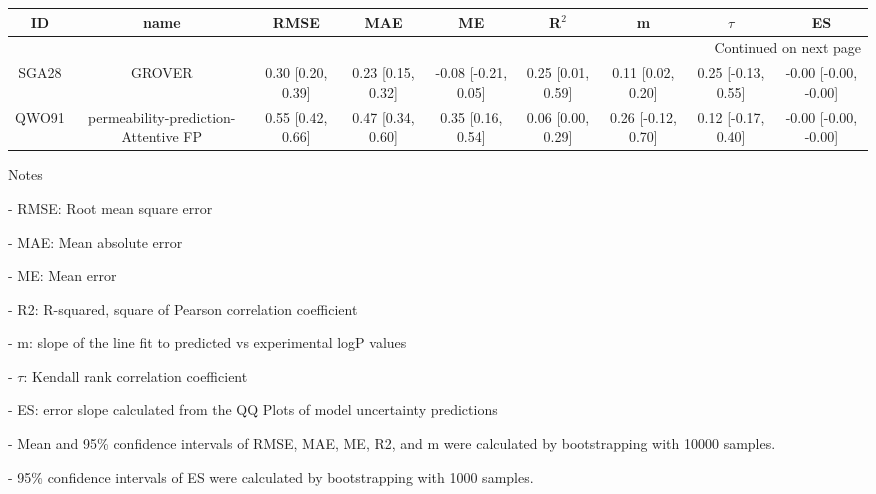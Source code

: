 \documentclass{article}
\begin{document}
\begin{center}
\scriptsize
\begin{longtable}{|ccccccccc|}
\toprule
    ID &                                  name &               RMSE &                MAE &                   ME &              R$^2$ &                   m &              $\tau$ &                    ES \\
\midrule
\endhead
\midrule
\multicolumn{9}{r}{{Continued on next page}} \\
\midrule
\endfoot

\bottomrule
\endlastfoot
 SGA28 &                                GROVER &  0.30 [0.20, 0.39] &  0.23 [0.15, 0.32] &  -0.08 [-0.21, 0.05] &  0.25 [0.01, 0.59] &   0.11 [0.02, 0.20] &  0.25 [-0.13, 0.55] &  -0.00 [-0.00, -0.00] \\
 QWO91 &  permeability-prediction-Attentive FP &  0.55 [0.42, 0.66] &  0.47 [0.34, 0.60] &    0.35 [0.16, 0.54] &  0.06 [0.00, 0.29] &  0.26 [-0.12, 0.70] &  0.12 [-0.17, 0.40] &  -0.00 [-0.00, -0.00] \\
\end{longtable}
\end{center}

Notes

- RMSE: Root mean square error

- MAE: Mean absolute error

- ME: Mean error

- R2: R-squared, square of Pearson correlation coefficient

- m: slope of the line fit to predicted vs experimental logP values

- $\tau$:  Kendall rank correlation coefficient

- ES: error slope calculated from the QQ Plots of model uncertainty predictions

- Mean and 95\% confidence intervals of RMSE, MAE, ME, R2, and m were calculated by bootstrapping with 10000 samples.

- 95\% confidence intervals of ES were calculated by bootstrapping with 1000 samples.\end{document}
\end{document}
